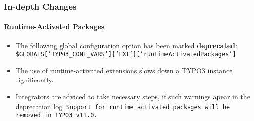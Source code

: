 
\begin{frame}[fragile]
	\frametitle{In-depth Changes}
	\framesubtitle{Runtime-Activated Packages}

	\begin{itemize}
		\item The following global configuration option has been marked \textbf{deprecated}:\newline
			\smaller
				\texttt{\$GLOBALS['TYPO3\_CONF\_VARS']['EXT']['runtimeActivatedPackages']}
			\normalsize
		\item The use of runtime-activated extensions slows down a TYPO3 instance significantly.
		\item Integrators are adviced to take necessary steps, if such warnings apear
			in the deprecation log:\newline
			\begingroup
				\fontsize{8}{10}
				\texttt{Support for runtime activated packages will be removed in TYPO3 v11.0.}
			\endgroup

	\end{itemize}

\end{frame}


